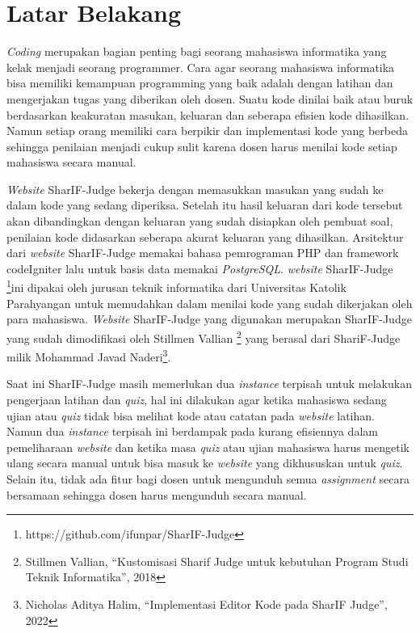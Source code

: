 \documentclass[a4paper,twoside]{article}
\begin{document}
\section{Latar Belakang}
	\textit{Coding} merupakan bagian penting bagi seorang mahasiswa informatika yang kelak menjadi seorang programmer. Cara agar seorang mahasiswa informatika bisa memiliki kemampuan programming yang baik adalah dengan latihan dan mengerjakan tugas yang diberikan oleh dosen. Suatu kode dinilai baik atau buruk berdasarkan keakuratan masukan, keluaran dan seberapa efisien kode dihasilkan. Namun setiap orang memiliki cara berpikir dan implementasi kode yang berbeda sehingga penilaian menjadi cukup sulit karena dosen harus menilai kode setiap mahasiswa secara manual.
    
    \textit{Website} SharIF-Judge bekerja dengan memasukkan masukan yang sudah ke dalam kode yang sedang diperiksa. Setelah itu hasil keluaran dari kode tersebut akan dibandingkan dengan keluaran yang sudah disiapkan oleh pembuat soal, penilaian kode didasarkan seberapa akurat keluaran yang dihasilkan. Arsitektur dari \textit{website} SharIF-Judge memakai bahasa pemrograman PHP dan framework codeIgniter lalu untuk basis data memakai \textit{PostgreSQL}. \textit{website} SharIF-Judge  \footnote{https://github.com/ifunpar/SharIF-Judge}ini dipakai oleh jurusan teknik informatika dari Universitas Katolik Parahyangan untuk memudahkan dalam menilai kode yang sudah dikerjakan oleh para mahasiswa. \textit{Website} SharIF-Judge yang digunakan merupakan SharIF-Judge yang sudah dimodifikasi oleh Stillmen Vallian \footnote{Stillmen Vallian, “Kustomisasi Sharif Judge untuk kebutuhan Program Studi Teknik Informatika”, 2018} yang berasal dari ShariF-Judge milik Mohammad Javad Naderi\footnote{Nicholas Aditya Halim, “Implementasi Editor Kode pada SharIF Judge”, 2022}.

	Saat ini SharIF-Judge masih memerlukan dua \textit{instance} terpisah untuk melakukan pengerjaan latihan dan \textit{quiz}, hal ini dilakukan agar ketika mahasiswa sedang ujian atau \textit{quiz} tidak bisa melihat kode atau catatan pada \textit{website} latihan. Namun dua \textit{instance} terpisah ini berdampak pada kurang efisiennya dalam pemeliharaan \textit{website} dan ketika masa \textit{quiz} atau ujian mahasiswa harus mengetik ulang secara manual untuk bisa masuk ke \textit{website} yang dikhususkan untuk \textit{quiz}. Selain itu, tidak ada fitur bagi dosen untuk mengunduh semua \textit{assignment} secara bersamaan sehingga dosen harus mengunduh secara manual.
\end{document}
